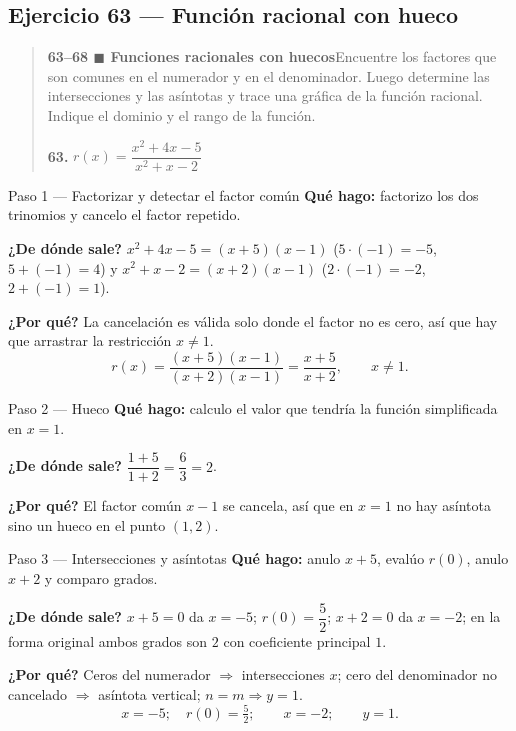 \documentclass[11pt]{article}
\begin{document}
\subsection*{Ejercicio 63 — Función racional con hueco}

\begin{quote}
\textbf{63--68 $\blacksquare$ Funciones racionales con huecos}\quad Encuentre los factores que son comunes en el numerador y en el denominador. Luego determine las intersecciones y las asíntotas y trace una gráfica de la función racional. Indique el dominio y el rango de la función.

\textbf{63.} $r(x)=\dfrac{x^2+4x-5}{x^2+x-2}$
\end{quote}

\begin{paso}{Paso 1 --- Factorizar y detectar el factor común}
\textbf{Qué hago:} factorizo los dos trinomios y cancelo el factor repetido.

\textbf{¿De dónde sale?} $x^2+4x-5=(x+5)(x-1)$ ($5\cdot(-1)=-5$, $5+(-1)=4$) y $x^2+x-2=(x+2)(x-1)$ ($2\cdot(-1)=-2$, $2+(-1)=1$).

\textbf{¿Por qué?} La cancelación es válida solo donde el factor no es cero, así que hay que arrastrar la restricción $x\ne 1$.
\[
r(x)=\frac{(x+5)(x-1)}{(x+2)(x-1)}=\frac{x+5}{x+2},\qquad x\ne 1 .
\]
\end{paso}

\begin{paso}{Paso 2 --- Hueco}
\textbf{Qué hago:} calculo el valor que tendría la función simplificada en $x=1$.

\textbf{¿De dónde sale?} $\dfrac{1+5}{1+2}=\dfrac63=2$.

\textbf{¿Por qué?} El factor común $x-1$ se cancela, así que en $x=1$ no hay asíntota sino un hueco en el punto $(1,2)$.
\end{paso}

\begin{paso}{Paso 3 --- Intersecciones y asíntotas}
\textbf{Qué hago:} anulo $x+5$, evalúo $r(0)$, anulo $x+2$ y comparo grados.

\textbf{¿De dónde sale?} $x+5=0$ da $x=-5$; $r(0)=\dfrac{5}{2}$; $x+2=0$ da $x=-2$; en la forma original ambos grados son $2$ con coeficiente principal $1$.

\textbf{¿Por qué?} Ceros del numerador $\Rightarrow$ intersecciones $x$; cero del denominador no cancelado $\Rightarrow$ asíntota vertical; $n=m \Rightarrow y=1$.
\[
x=-5;\quad r(0)=\tfrac52;\qquad x=-2;\qquad y=1 .
\]
\end{paso}
\end{document}
